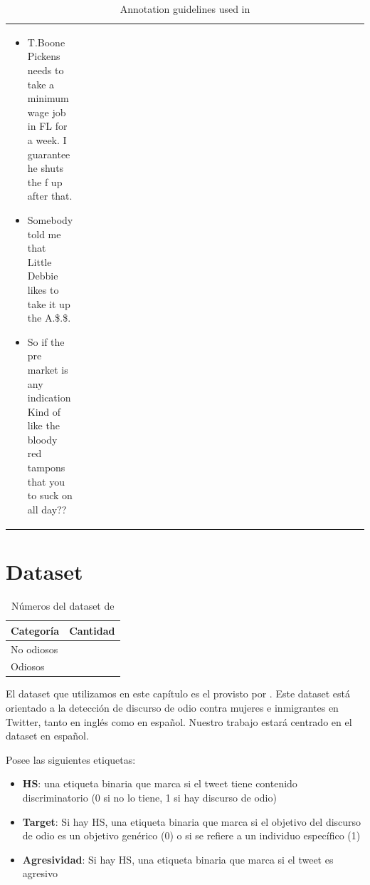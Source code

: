 \begin{table}[t]
\begin{tabular}{p{0.20\linewidth}  p{0.80\linewidth}}
        \begin{itemize}
            \item T.Boone Pickens needs to take a minimum wage job in FL for a week. I guarantee he shuts the f up after that.
            \item Somebody told me that Little Debbie likes to take it up the A.\$.\$.
            \item So if the pre market is any indication Kind of like the bloody red tampons that you to suck on all day??
        \end{itemize}
         \\
    \end{tabular}
    \caption{Annotation guidelines used in \cite{nobata2016abusive}}

    \label{tab:nobata_guidelines}
\end{table}


\section{Dataset}

\begin{table}[t]
    \centering
\begin{tabular}{ll}
    Categoría  & Cantidad \\
    \hline
    No odiosos &          \\
    Odiosos    &          \\
\end{tabular}
\caption{Números del dataset de \citet{hateval2019semeval}}
\label{tab:hateval_dataset}
\end{table}

El dataset que utilizamos en este capítulo es el provisto por \citet{hateval2019semeval}. Este dataset está orientado a la detección de discurso de odio contra mujeres e inmigrantes en Twitter, tanto en inglés como en español. Nuestro trabajo estará centrado en el dataset en español.

Posee las siguientes etiquetas:

\begin{itemize}
    \item \textbf{HS}: una etiqueta binaria que marca si el tweet tiene contenido discriminatorio (0 si no lo tiene, 1 si hay discurso de odio)
    \item \textbf{Target}: Si hay HS, una etiqueta binaria que marca si el objetivo del discurso de odio es un objetivo genérico (0) o si se refiere a un individuo específico (1)
    \item \textbf{Agresividad}: Si hay HS, una etiqueta binaria que marca si el tweet es agresivo
\end{itemize}



